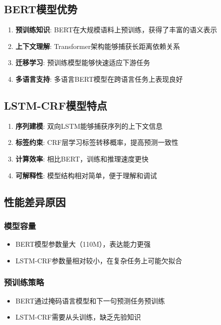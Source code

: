 \documentclass[12pt,a4paper]{article}
\begin{document}
\subsection{BERT模型优势}

\begin{enumerate}
    \item \textbf{预训练知识}: BERT在大规模语料上预训练，获得了丰富的语义表示
    \item \textbf{上下文理解}: Transformer架构能够捕获长距离依赖关系
    \item \textbf{迁移学习}: 预训练模型能够快速适应下游任务
    \item \textbf{多语言支持}: 多语言BERT模型在跨语言任务上表现良好
\end{enumerate}

\subsection{LSTM-CRF模型特点}

\begin{enumerate}
    \item \textbf{序列建模}: 双向LSTM能够捕获序列的上下文信息
    \item \textbf{标签约束}: CRF层学习标签转移概率，提高预测一致性
    \item \textbf{计算效率}: 相比BERT，训练和推理速度更快
    \item \textbf{可解释性}: 模型结构相对简单，便于理解和调试
\end{enumerate}

\subsection{性能差异原因}

\subsubsection{模型容量}
\begin{itemize}
    \item BERT模型参数量大（110M），表达能力更强
    \item LSTM-CRF参数量相对较小，在复杂任务上可能欠拟合
\end{itemize}

\subsubsection{预训练策略}
\begin{itemize}
    \item BERT通过掩码语言模型和下一句预测任务预训练
    \item LSTM-CRF需要从头训练，缺乏先验知识
\end{itemize}
\end{document}
